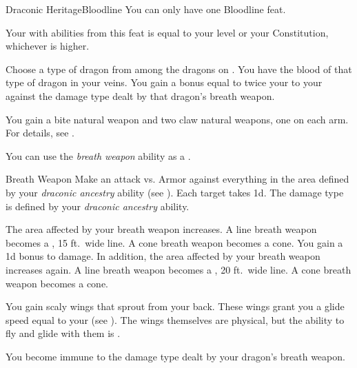     \begin{feat}{Draconic Heritage}{Bloodline}
         You can only have one Bloodline feat.

         Your  with abilities from this feat is equal to your level or your Constitution, whichever is higher.

         Choose a type of dragon from among the dragons on .
        You have the blood of that type of dragon in your veins.
        You gain a bonus equal to twice your  to your  against the damage type dealt by that dragon's breath weapon.

         You gain a bite natural weapon and two claw natural weapons, one on each arm.
        For details, see .

         You can use the \textit{breath weapon} ability as a .
        \begin{freeability}{Breath Weapon}
            Make an attack vs. Armor against everything in the area defined by your \textit{draconic ancestry} ability (see ).
            \hit Each target takes  \minus1d.
            The damage type is defined by your \textit{draconic ancestry} ability.

            \rankline
             The area affected by your breath weapon increases.
                A line breath weapon becomes a \areahuge, 15 ft.\ wide line.
                A cone breath weapon becomes a \arealarge cone.
             You gain a \plus1d bonus to damage.
                In addition, the area affected by your breath weapon increases again.
                A line breath weapon becomes a \areahuge, 20 ft.\ wide line.
                A cone breath weapon becomes a \areahuge cone.
        \end{freeability}

         You gain scaly wings that sprout from your back.
        These wings grant you a glide speed equal to your  (see ).
        The wings themselves are physical, but the ability to fly and glide with them is .

         You become immune to the damage type dealt by your dragon's breath weapon.


\end{feat}
